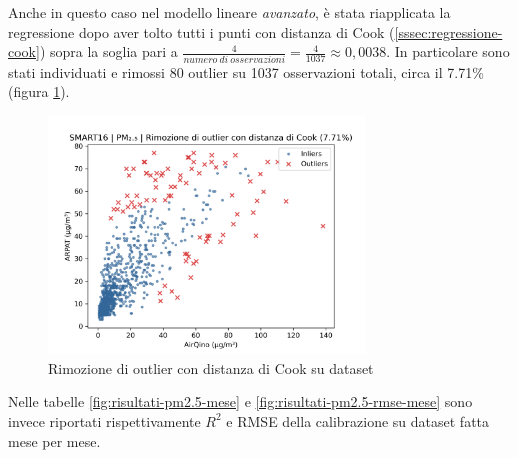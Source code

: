 Anche in questo caso nel modello lineare \textit{avanzato}, è stata riapplicata la regressione dopo aver tolto tutti i punti con distanza di Cook (\ref{sssec:regressione-cook}) sopra la soglia pari a $\frac{4}{numero\ di\ osservazioni} = \frac{4}{1037} \approx 0,0038$. In particolare sono stati individuati e rimossi 80 outlier su 1037 osservazioni totali, circa il 7.71\% (figura \ref{fig:cook-pm2.5}).

\begin{figure}[H]
\centering
\includegraphics[width=0.75\textwidth,height=\textheight,keepaspectratio]{img/cook_pm2.5.png}
\caption{Rimozione di outlier con distanza di Cook su dataset }%
\label{fig:cook-pm2.5}%
\end{figure}

Nelle tabelle \ref{fig:risultati-pm2.5-mese} e \ref{fig:risultati-pm2.5-rmse-mese} sono invece riportati rispettivamente $R^2$ e RMSE della calibrazione su dataset  fatta mese per mese.

